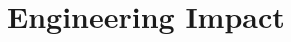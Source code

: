 \documentclass[../mthe-493-final-project.tex]{subfiles}
\begin{document}
    \chapter{Engineering Impact}
    \label{ch:engineering-impact}
\end{document}
